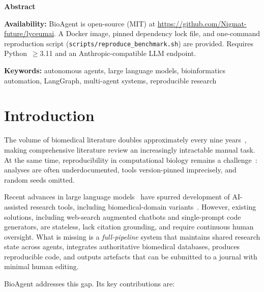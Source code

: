 \documentclass[11pt]{article}
\renewenvironment{abstract}{%
  \begin{center}{\bfseries\large Abstract}\end{center}
  \begin{list}{}{%
    \setlength{\leftmargin}{0.4in}%
    \setlength{\rightmargin}{0.4in}}\item\relax\small
}{%
  \end{list}\vspace{0.5ex}%
}
\begin{document}
\begin{abstract}
\textbf{Availability:}
BioAgent is open-source (MIT) at
\url{https://github.com/Nigmat-future/lyceumai}.
A Docker image, pinned dependency lock file, and one-command reproduction
script (\texttt{scripts/reproduce\_benchmark.sh}) are provided.
Requires Python~$\geq$3.11 and an Anthropic-compatible LLM endpoint.
\end{abstract}

\noindent
\textbf{Keywords:} autonomous agents, large language models, bioinformatics
automation, LangGraph, multi-agent systems, reproducible research

\section{Introduction}

The volume of biomedical literature doubles approximately every nine
years~\cite{bornmann2015}, making comprehensive literature review an
increasingly intractable manual task.
At the same time, reproducibility in computational biology remains a
challenge~\cite{Piccolo2016,Baker2016}: analyses are often
underdocumented, tools version-pinned imprecisely, and random seeds
omitted.

Recent advances in large language models~\cite{OpenAI2023gpt4,anthropic2024}
have spurred development of AI-assisted research tools, including
biomedical-domain variants~\cite{Lee2023biomedlm}.
However, existing solutions, including web-search augmented chatbots and
single-prompt code generators, are stateless, lack citation grounding, and
require continuous human oversight.
What is missing is a \emph{full-pipeline} system that maintains shared
research state across agents, integrates authoritative biomedical databases,
produces reproducible code, and outputs artefacts that can be submitted to
a journal with minimal human editing.

BioAgent addresses this gap.
Its key contributions are:
\end{document}
